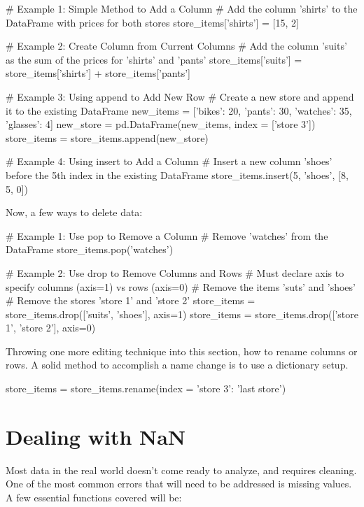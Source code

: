 \documentclass{article}
\begin{document}
\begin{python}
	# Example 1: Simple Method to Add a Column
	# Add the column 'shirts' to the DataFrame with prices for both stores
	store_items['shirts'] = [15, 2]
	
	# Example 2: Create Column from Current Columns
	# Add the column 'suits' as the sum of the prices for 'shirts' and 'pants'
	store_items['suits'] = store_items['shirts'] + store_items['pants']
	
	# Example 3: Using append to Add New Row
	# Create a new store and append it to the existing DataFrame
	new_items = [{'bikes': 20, 'pants': 30, 'watches': 35, 'glasses': 4}]
	new_store = pd.DataFrame(new_items, index = ['store 3'])
	store_items = store_items.append(new_store)
	
	# Example 4: Using insert to Add a Column
	# Insert a new column 'shoes' before the 5th index in the existing DataFrame
	store_items.insert(5, 'shoes', [8, 5, 0])
\end{python}

Now, a few ways to delete data:

\begin{python}
	# Example 1: Use pop to Remove a Column
	# Remove 'watches' from the DataFrame
	store_items.pop('watches')
	
	# Example 2: Use drop to Remove Columns and Rows
	# Must declare axis to specify columns (axis=1) vs rows (axis=0)
	# Remove the items 'suts' and 'shoes'
	# Remove the stores 'store 1' and 'store 2'
	store_items = store_items.drop(['suits', 'shoes'], axis=1)
	store_items = store_items.drop(['store 1', 'store 2'], axis=0)
\end{python}

Throwing one more editing technique into this section, how to rename columns or rows. A solid method to accomplish a name change is to use a dictionary setup.

\begin{python}
	store_items = store_items.rename(index = {'store 3': 'last store'})
\end{python}


\section{Dealing with NaN}\label{sec:concept6}
Most data in the real world doesn't come ready to analyze, and requires cleaning. One of the most common errors that will need to be addressed is missing values. A few essential functions covered will be:
\end{document}
